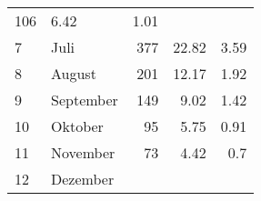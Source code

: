\begin{longtable}{lXrrr}
       \num{106} &
       \num[round-mode=places,round-precision=2]{6.42} &
         \num[round-mode=places,round-precision=2]{1.01} \\

     7 &
     \multicolumn{1}{X}{ Juli   } &


       \num{377} &
       \num[round-mode=places,round-precision=2]{22.82} &
         \num[round-mode=places,round-precision=2]{3.59} \\

     8 &
     \multicolumn{1}{X}{ August   } &


       \num{201} &
       \num[round-mode=places,round-precision=2]{12.17} &
         \num[round-mode=places,round-precision=2]{1.92} \\

     9 &
     \multicolumn{1}{X}{ September   } &


       \num{149} &
       \num[round-mode=places,round-precision=2]{9.02} &
         \num[round-mode=places,round-precision=2]{1.42} \\

     10 &
     \multicolumn{1}{X}{ Oktober   } &


       \num{95} &
       \num[round-mode=places,round-precision=2]{5.75} &
         \num[round-mode=places,round-precision=2]{0.91} \\

     11 &
     \multicolumn{1}{X}{ November   } &


       \num{73} &
       \num[round-mode=places,round-precision=2]{4.42} &
         \num[round-mode=places,round-precision=2]{0.7} \\

     12 &
     \multicolumn{1}{X}{ Dezember   } &



\end{longtable}
